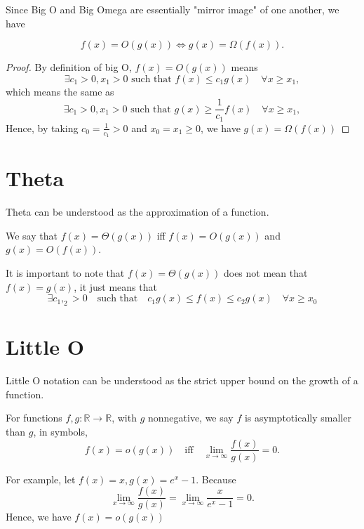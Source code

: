 Since Big O and Big Omega are essentially "mirror image" of one another, we have

\begin{theorem}
   \[
    f(x) = O(g(x)) \Longleftrightarrow g(x) = \Omega (f(x)).
   \] 
\end{theorem}

\begin{proof}
    By definition of big O, \(f(x) = O(g(x))\) means
    \[
        \exists c_1 > 0, x_1 > 0 \text{ such that } f(x) \leq c_1 g(x) \quad \forall x \geq x_1,
    \] 
    which means the same as
    \[
        \exists c_1 > 0, x_1 > 0 \text{ such that } g(x) \geq \dfrac{1}{c_1}f(x) \quad \forall x \geq x_1,
    \]
    Hence, by taking \(c_0 = \frac{1}{c_1} > 0\) and \(x_0 = x_1 \geq 0\), we have \(g(x) = \Omega(f(x))\) 
\end{proof}

\section{Theta}
Theta can be understood as the approximation of a function. 
\begin{definition}
    We say that \(f(x) = \Theta(g(x))\) iff \(f(x) = O(g(x))\) and \(g(x) = O(f(x))\). 
    \begin{remark}
        It is important to note that \(f(x) = \Theta(g(x))\) does not mean that \(f(x) = g(x)\), it just means that
    \[
        \exists c_1, _2 > 0 \quad\text{such that}\quad c_1 g(x) \leq f(x) \leq c_2 g(x)\quad \forall x \geq  x_0 
    \] 
    \end{remark}
    
\end{definition}

\section{Little O}
Little O notation can be understood as the strict upper bound on the growth of a function.

\begin{definition}
    For functions \(f, g: \mathbb{R} \to \mathbb{R}\), with \(g\) nonnegative, we say \(f\) is asymptotically smaller than \(g\), in symbols,
    \[
        f(x) = o(g(x))\quad\text{iff}\quad\lim_{x \to \infty} \dfrac{f(x)}{g(x)} = 0. 
    \]
\end{definition}

\begin{eg}
    For example, let \(f(x) = x, g(x) = e^x - 1\). Because 
    \[
        \lim_{x \to \infty} \dfrac{f(x)}{g(x)} = \lim_{x \to \infty} \dfrac{x}{e^x - 1} = 0.
    \]
    Hence, we have \(f(x) = o(g(x))\) 
\end{eg}

